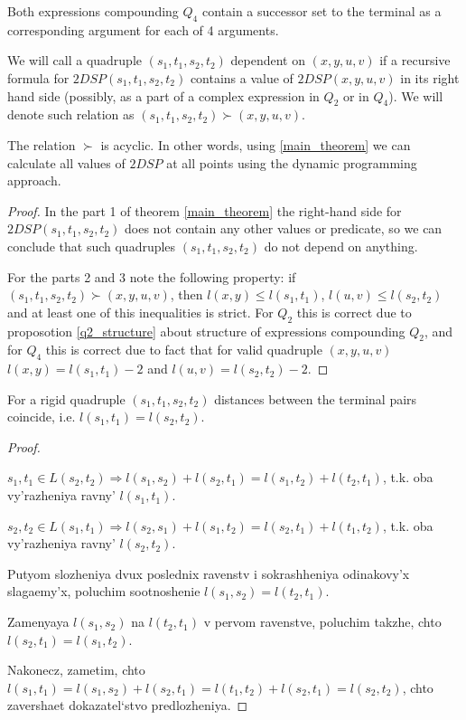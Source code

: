 \begin{proposition}
Both expressions compounding $Q_4$ contain a successor set to the terminal as a corresponding argument for each of 4 arguments.
\end{proposition}

We will call a quadruple $(s_1, t_1, s_2, t_2)$ dependent on $(x, y, u, v)$ if a recursive formula for $2DSP(s_1, t_1, s_2, t_2)$ contains a value of $2DSP(x, y, u, v)$ in its right hand side (possibly, as a part of a complex expression in $Q_2$ or in $Q_4$). We will denote such relation as $(s_1, t_1, s_2, t_2) \succ (x, y, u, v)$.

\begin{proposition}
The relation $\succ$ is acyclic. In other words, using \ref{main_theorem} we can calculate all values of $2DSP$ at all points using the dynamic programming approach.
\end{proposition}
\begin{proof}
In the part 1 of theorem \ref{main_theorem} the right-hand side for $2DSP(s_1, t_1, s_2, t_2)$ does not contain any other values or predicate, so we can conclude that such quadruples $(s_1, t_1, s_2, t_2)$ do not depend on anything.

For the parts 2 and 3 note the following property: if $(s_1, t_1, s_2, t_2) \succ (x, y, u, v)$, then $l(x, y) \leq l(s_1, t_1)$, $l(u, v) \leq l(s_2, t_2)$ and at least one of this inequalities is strict. For $Q_2$ this is correct due to proposotion \ref{q2_structure} about structure of expressions compounding $Q_2$, and for $Q_4$ this is correct due to fact that for valid quadruple $(x, y, u, v)$ $l(x, y) = l(s_1, t_1) - 2$ and $l(u, v) = l(s_2, t_2) - 2$.
\end{proof}

\begin{proposition} \label{eql_ap}
For a rigid quadruple $(s_1, t_1, s_2, t_2)$ distances between the terminal pairs coincide, i.e. $l(s_1, t_1) = l(s_2, t_2)$.
\end{proposition}
\begin{proof} ~

$s_1, t_1 \in L(s_2, t_2) \Rightarrow l(s_1, s_2) + l(s_2, t_1) = l(s_1, t_2) + l(t_2, t_1)$, t.k. oba vy'razheniya ravny' $l(s_1, t_1)$.

$s_2, t_2 \in L(s_1, t_1) \Rightarrow l(s_2, s_1) + l(s_1, t_2) = l(s_2, t_1) + l(t_1, t_2)$, t.k. oba vy'razheniya ravny' $l(s_2, t_2)$.

Putyom slozheniya dvux poslednix ravenstv i sokrashheniya odinakovy'x slagaemy'x, poluchim sootnoshenie $l(s_1, s_2) = l(t_2, t_1)$. 

Zamenyaya $l(s_1, s_2)$ na $l(t_2, t_1)$ v pervom ravenstve, poluchim takzhe, chto $l(s_2, t_1) = l(s_1, t_2)$.

Nakonecz, zametim, chto $l(s_1, t_1) = l(s_1, s_2) + l(s_2, t_1) = l(t_1, t_2) + l(s_2, t_1) = l(s_2, t_2)$, chto zavershaet dokazatel`stvo predlozheniya.
\end{proof}

